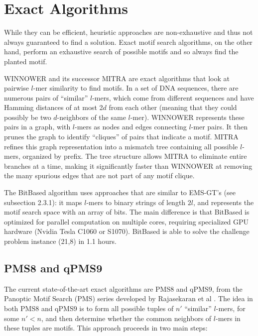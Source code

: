 \documentclass[oneside,12pt]{DISCSthesis}
\begin{document}
	\section{Exact Algorithms}
		While they can be efficient, heuristic approaches are non-exhaustive and thus not always guaranteed to find a solution. Exact motif search algorithms, on the other hand, perform an exhaustive search of possible motifs and so always find the planted motif.

		WINNOWER \cite{pevzner2000combinatorial} and its successor MITRA \cite{eskin2002finding} are exact algorithms that look at pairwise $l$-mer similarity to find motifs. In a set of DNA sequences, there are numerous pairs of ``similar'' $l$-mers, which come from different sequences and have Hamming distances of at most 2$d$ from each other (meaning that they could possibly be two $d$-neighbors of the same $l$-mer). WINNOWER represents these pairs in a graph, with $l$-mers as nodes and edges connecting $l$-mer pairs. It then prunes the graph to identify ``cliques'' of pairs that indicate a motif. MITRA refines this graph representation into a mismatch tree containing all possible $l$-mers, organized by prefix. The tree structure allows MITRA to eliminate entire branches at a time, making it significantly faster than WINNOWER at removing the many spurious edges that are not part of any motif clique.

		The BitBased algorithm \cite{dasari2010efficient} uses approaches that are similar to EMS-GT's (see subsection 2.3.1): it maps $l$-mers to binary strings of length $2l$, and represents the motif search space with an array of bits. The main difference is that BitBased is optimized for parallel computation on multiple cores, requiring specialized GPU hardware (Nvidia Tesla C1060 or S1070). BitBased is able to solve the challenge problem instance (21,8) in 1.1 hours.

	\subsection{PMS8 and qPMS9}
		The current state-of-the-art exact algorithms are PMS8 and qPMS9, from the Panoptic Motif Search (PMS) series
		 developed by Rajasekaran et al
		\cite{pms2007,pms2014,pms2015}. The idea in both PMS8 and qPMS9 is to form all possible tuples of $n'$ ``similar'' $l$-mers, for some $n' < n$, and then determine whether the common neighbors of $l$-mers in these tuples are motifs. This approach proceeds in two main steps:
\end{document}
